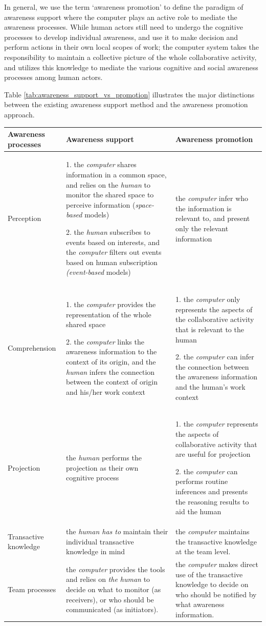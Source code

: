 In general, we use the term `awareness promotion' to define the paradigm of awareness support where the computer plays an active role to mediate the awareness processes. While human actors still need to undergo the cognitive processes to develop individual awareness, and use it to make decision and perform actions in their own local scopes of work; the computer system takes the responsibility to maintain a collective picture of the whole collaborative activity, and utilizes this knowledge to mediate the various cognitive and social awareness processes among human actors.

Table \ref{tab:awareness_support_vs_promotion} illustrates the major distinctions between the existing awareness support method and the awareness promotion approach.

\begin{table}[htbp]
\centering
\footnotesize
\begin{tabular}{>{\raggedright}p{1.1in}>{\raggedright}p{2.2in}>{\raggedright}p{2.2in}}

\toprule 
\textbf{Awareness processes} & \textbf{Awareness support} & \textbf{Awareness promotion}\tabularnewline
\midrule 
Perception & 1. the \emph{computer} shares information in a common space, and relies
on the \emph{human} to monitor the shared space to perceive information
(\emph{space-based} models)

2. the \emph{human} subscribes to events based on interests, and the
\emph{computer} filters out events based on human subscription\emph{
(event-based} models)  & the \emph{computer} infer who the information is relevant to, and
present only the relevant information\tabularnewline
\midrule 
Comprehension & 1. the \emph{computer} provides the representation of the whole shared
space

2. the \emph{computer} links the awareness information to the context
of its origin, and the \emph{human} infers the connection between
the context of origin and his/her work context & 1. the \emph{computer} only represents the aspects of the collaborative
activity that is relevant to the human

2. the \emph{computer} can infer the connection between the awareness
information and the human's work context\tabularnewline
\midrule 
Projection & the \emph{human} performs the projection as their own cognitive process & 1. the \emph{computer} represents the aspects of collaborative activity
that are useful for projection 

2. the \emph{computer} can performs routine inferences and presents
the reasoning results to aid the human\tabularnewline
\midrule 
Transactive knowledge & the \emph{human has to} maintain their individual transactive knowledge
in mind & the \emph{computer} maintains the transactive knowledge at the team
level.\tabularnewline
\midrule 
Team processes & the \emph{computer }provides the tools and relies on\emph{ the human}
to decide on what to monitor (as receivers), or who should be communicated
(as initiators). & the \emph{computer} makes direct use of the transactive knowledge
to decide on who should be notified by what awareness information.\tabularnewline
\bottomrule


\end{tabular}
\end{table}

